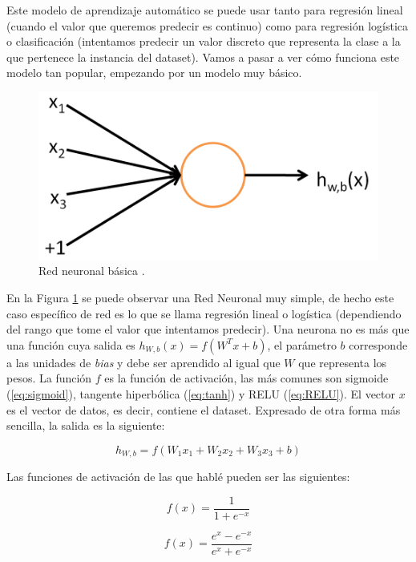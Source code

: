 Este modelo de aprendizaje automático se puede usar tanto para regresión lineal (cuando el valor que queremos predecir es continuo) como para regresión logística o clasificación (intentamos predecir un valor discreto que representa la clase a la que pertenece la instancia del dataset). Vamos a pasar a ver cómo funciona este modelo tan popular, empezando por un modelo muy básico.

\begin{figure}[H]
	\includegraphics[scale=0.25]{imagenes/03_Estado_del_arte/simplenn.png}
	\centering
	\caption{Red neuronal básica \cite{ng}.}
	\label{fig:simlestnn}
\end{figure}

En la Figura \ref{fig:simlestnn} se puede observar una Red Neuronal muy simple, de hecho este caso específico de red es lo que se llama regresión lineal o logística (dependiendo del rango que tome el valor que intentamos predecir). Una neurona no es más que una función cuya salida es $h_{W,b}(x)=f(W^Tx+b)$, el parámetro $b$ corresponde a las unidades de \textit{bias} y debe ser aprendido al igual que $W$ que representa los pesos. La función $f$ es la función de activación, las más comunes son sigmoide (\ref{eq:sigmoid}), tangente hiperbólica (\ref{eq:tanh}) y RELU (\ref{eq:RELU}). El vector $x$ es el vector de datos, es decir, contiene el dataset. Expresado de otra forma más sencilla, la salida es la siguiente:\newline

$$h_{W,b}=f(W_1 x_1+ W_2 x_2 + W_3 x_3 + b)$$

Las funciones de activación de las que hablé pueden ser las siguientes:

\begin{equation}
	f(x) = \frac{1}{1+e^{-x}}
	\label{eq:sigmoid}
\end{equation}

\begin{equation}
	f(x) = \frac{e^x - e^{-x}}{e^x + e^{-x}}
	\label{eq:tanh}
\end{equation}

